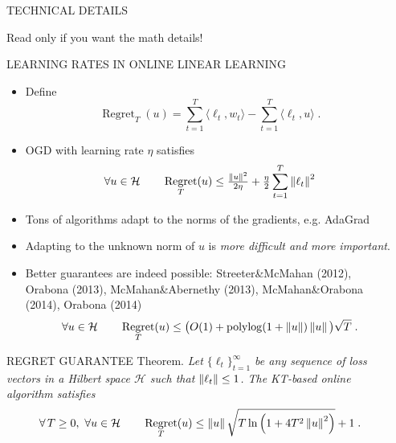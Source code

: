 \documentclass[final,t,serif,mathserif]{beamer}
\renewcommand{\H}{\mathcal{H}}  %
\DeclareMathOperator{\Regret}{Regret}
\DeclareMathOperator{\polylog}{polylog}
\def\spaziooo{\vspace{-0.cm}}
\begin{document}
\begin{frame}{}
\begin{columns}[t]
\begin{column}{.33\linewidth}
    \end{column}


    \begin{column}{.33\linewidth}


    \begin{block}{TECHNICAL DETAILS}
    \begin{minipage}{.98\linewidth}

    Read only if you want the math details!

    \begin{block}{LEARNING RATES IN ONLINE LINEAR LEARNING}
    \spaziooo
    \begin{itemize}
      \item Define
      \[
        \Regret_T(u) = \sum_{t=1}^T \langle \ell_t, w_t \rangle - \sum_{t=1}^T \langle \ell_t, u \rangle  \; .
      \]
      \item OGD with learning rate $\eta$ satisfies
	\[
	\forall u \in \H \qquad \Regret_T(u) \le \tfrac{\norm{u}^2}{2\eta} + \tfrac{\eta}{2} \sum_{t=1}^T \norm{\ell_t}^2
	\]
      \item Tons of algorithms adapt to the norms of the gradients, e.g. AdaGrad
      \item Adapting to the unknown norm of $u$ is \emph{more difficult and more important}.
      \item Better guarantees are indeed possible: Streeter\&McMahan (2012), Orabona (2013), McMahan\&Abernethy (2013), McMahan\&Orabona (2014), Orabona (2014) 
	\[
	\forall u \in \H \qquad \Regret_T(u) \le \big(O(1)+\polylog(1 + \norm{u})\norm{u} \big) \sqrt{T} \; .
	\]
    \end{itemize}
    \spaziooo
    \end{block}

    \begin{block}{REGRET GUARANTEE}
    \spaziooo
    \alert{Theorem.} \emph{
	Let $\{\ell_t\}_{t=1}^\infty$ be any sequence of loss vectors
	in a Hilbert space $\H$ such that $\left\|{\ell_t}\right\| \le 1$.
	The KT-based online algorithm satisfies
	$$
	\forall \, T \ge 0, \
	\forall u \in \H \qquad
	\Regret_T(u) \le \norm{u} \sqrt{T \ln\left(1 + 4T^2 \norm{u}^2 \right)} + 1 \;.
	$$
    }

    \vspace{1cm}


\end{block}
\end{minipage}
\end{block}
\end{column}
\end{columns}
\end{frame}
\end{document}
